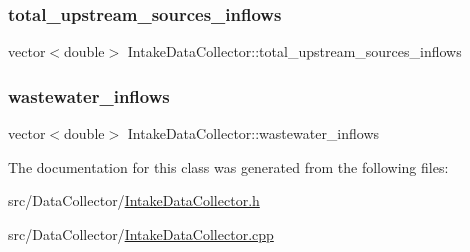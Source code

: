 \mbox{\label{classIntakeDataCollector_a5016d2fece2ef545f72b9fa22497c817_a5016d2fece2ef545f72b9fa22497c817}} 
\subsubsection{\texorpdfstring{total\+\_\+upstream\+\_\+sources\+\_\+inflows}{total\_upstream\_sources\_inflows}}
{\footnotesize\ttfamily vector$<$double$>$ Intake\+Data\+Collector\+::total\+\_\+upstream\+\_\+sources\+\_\+inflows\hspace{0.3cm}{\ttfamily [private]}}

\mbox{\label{classIntakeDataCollector_a4485bea7a536f9fde233a2cc37200ec6_a4485bea7a536f9fde233a2cc37200ec6}} 
\subsubsection{\texorpdfstring{wastewater\+\_\+inflows}{wastewater\_inflows}}
{\footnotesize\ttfamily vector$<$double$>$ Intake\+Data\+Collector\+::wastewater\+\_\+inflows\hspace{0.3cm}{\ttfamily [private]}}



The documentation for this class was generated from the following files\+:\begin{DoxyCompactItemize}
\item 
src/\+Data\+Collector/\mbox{\hyperlink{IntakeDataCollector_8h}{Intake\+Data\+Collector.\+h}}\item 
src/\+Data\+Collector/\mbox{\hyperlink{IntakeDataCollector_8cpp}{Intake\+Data\+Collector.\+cpp}}\end{DoxyCompactItemize}
